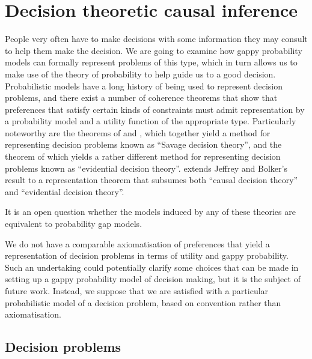 

\section{Decision theoretic causal inference}\label{sec:seedo_models}

People very often have to make decisions with some information they may consult to help them make the decision. We are going to examine how gappy probability models can formally represent problems of this type, which in turn allows us to make use of the theory of probability to help guide us to a good decision. Probabilistic models have a long history of being used to represent decision problems, and there exist a number of coherence theorems that show that preferences that satisfy certain kinds of constraints must admit representation by a probability model and a utility function of the appropriate type. Particularly noteworthy are the theorems of \citet{ramsey_truth_2016} and \citet{savage_foundations_1954}, which together yield a method for representing decision problems known as ``Savage decision theory'', and the theorem of \citet{bolker_functions_1966,jeffrey_logic_1990} which yields a rather different method for representing decision problems known as ``evidential decision theory''. \citet{joyce_foundations_1999} extends Jeffrey and Bolker's result to a representation theorem that subsumes both ``causal decision theory'' and ``evidential decision theory''.

It is an open question whether the models induced by any of these theories are equivalent to probability gap models.

We do not have a comparable axiomatisation of preferences that yield a representation of decision problems in terms of utility and gappy probability. Such an undertaking could potentially clarify some choices that can be made in setting up a gappy probability model of decision making, but it is the subject of future work. Instead, we suppose that we are satisfied with a particular probabilistic model of a decision problem, based on convention rather than axiomatisation.

\subsection{Decision problems}

